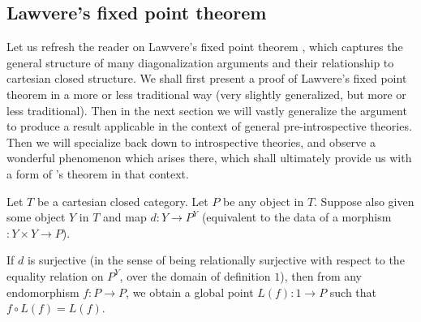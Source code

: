 \subsection{Lawvere's fixed point theorem}
Let us refresh the reader on Lawvere's fixed point theorem \autocite{lawvere1969diagonal}, which captures the general structure of many diagonalization arguments and their relationship to cartesian closed structure. We shall first present a proof of Lawvere's fixed point theorem in a more or less traditional way (very slightly generalized, but more or less traditional). Then in the next section we will vastly generalize the argument to produce a result applicable in the context of general pre-introspective theories. Then we will specialize back down to introspective theories, and observe a wonderful  phenomenon which arises there, which shall ultimately provide us with a form of \Loeb's theorem in that context.

\label{LawvereFPT}
Let $T$ be a cartesian closed category. Let $P$ be any object in $T$. Suppose also given some object $Y$ in $T$ and map $d : Y \to P^Y$ (equivalent to the data of a morphism $: Y \times Y \to P$).

If $d$ is surjective (in the sense of being relationally surjective with respect to the equality relation on $P^Y$, over the domain of definition $1$), then from any endomorphism $f: P \to P$, we obtain a global point $L(f) : 1 \to P$ such that $f \circ L(f) = L(f)$.

